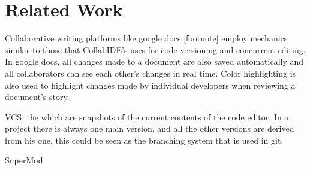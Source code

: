 

\section{Related Work}
\label{sec:related}

Collaborative writing platforms like google docs [footnote] employ mechanics similar to those that CollabIDE’s uses for code versioning and concurrent editing. In google docs, all changes made to a document are also saved automatically and all collaborators can see each other’s changes in real time. Color highlighting is also used to highlight changes made by individual developers when reviewing a document’s story. 

\ac{VCS}. the  which are snapshots of the current contents of the code editor. In a project there is always one main version, and all the other versions are derived from his one, this could be seen as the branching system that is used in git. 

SuperMod~\cite{schwagerl15}



\endinput

Ya que una de las funcionalidades principales de CollabIDE es la de permitir administrar distintas versiones de código, es necesario entonces discutir acerca de una de las herramientas de versionamiento más prominente y que tipo de operaciones esta le permite llevar a cabo a los desarrolladores que también son esenciales que tenga CollabIDE. Git\footnore{\url{https://git-scm.com/}} es un sistema de control de versiones diseñado para manejar cualquier proyectos de cualquier tamaño con eficiencia, a través de los años Git ha ido adquiriendo una enorme popularidad y se ha convertido en la herramienta principal de todo tipo de desarrolladores para llevar el versionamiento de sus proyectos, este incremento en popularidad se puede evidenciar en el hecho de que en el año 2009 el uso de git en proyectos de eclipse era de tan sólo el 2.4\%\footnote{\url{http://www.eclipse.org/org/press-release/Eclipse_Survey_2009_final.pdf}} y en el año 20014 alcanzo un porcentaje de uso del 33.3\%.\footnore{\url{https://www.slideshare.net/IanSkerrett/eclipse-community-survey-2014}} 

